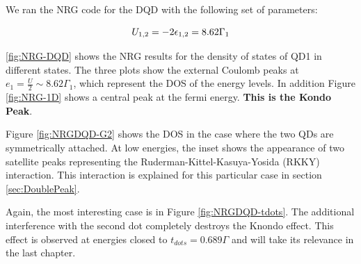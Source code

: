 We ran the NRG code for the DQD with the following set of parameters:




$$  U_{1,2} = -2\epsilon_{1,2} = 8.62\Gamma_1$$

\ref{fig:NRG-DQD} shows the NRG results for the density of states of QD1 in different states. The three plots show the external Coulomb peaks at $e_1 = \frac{U}{2} \sim 8.62\Gamma_1$, which represent the DOS of the energy levels. In addition  Figure \ref{fig:NRG-1D} shows a central peak at the fermi energy. \textbf{This is the Kondo Peak}. 

Figure \ref{fig:NRGDQD-G2} shows the DOS in the case where the two QDs are symmetrically attached.  At low energies, the inset shows the appearance of two satellite peaks representing the Ruderman-Kittel-Kasuya-Yosida (RKKY) interaction. This interaction is explained for this particular case in section \ref{sec:DoublePeak}.  

Again, the most interesting case is in Figure \ref{fig:NRGDQD-tdots}. The additional interference with the second dot completely destroys the Knondo effect. This effect is observed at energies closed to $t_{dots}=0.689\Gamma$ and  will take its relevance in the last chapter. 





